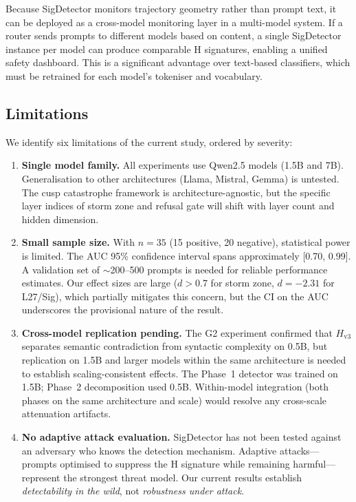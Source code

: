 \documentclass[12pt,a4paper]{article}
\begin{document}
Because SigDetector monitors trajectory geometry rather than prompt text, it can be deployed as a cross-model monitoring layer in a multi-model system. If a router sends prompts to different models based on content, a single SigDetector instance per model can produce comparable H signatures, enabling a unified safety dashboard. This is a significant advantage over text-based classifiers, which must be retrained for each model's tokeniser and vocabulary.

\subsection{Limitations}

We identify six limitations of the current study, ordered by severity:

\begin{enumerate}[leftmargin=*]
    \item \textbf{Single model family.} All experiments use Qwen2.5 models (1.5B and 7B). Generalisation to other architectures (Llama, Mistral, Gemma) is untested. The cusp catastrophe framework is architecture-agnostic, but the specific layer indices of storm zone and refusal gate will shift with layer count and hidden dimension.
    \item \textbf{Small sample size.} With $n = 35$ (15 positive, 20 negative), statistical power is limited. The AUC 95\% confidence interval spans approximately [0.70, 0.99]. A validation set of $\sim$200--500 prompts is needed for reliable performance estimates. Our effect sizes are large ($d > 0.7$ for storm zone, $d = -2.31$ for L27/Sig), which partially mitigates this concern, but the CI on the AUC underscores the provisional nature of the result.
    \item \textbf{Cross-model replication pending.} The G2 experiment confirmed that $H_{\text{v3}}$ separates semantic contradiction from syntactic complexity on 0.5B, but replication on 1.5B and larger models within the same architecture is needed to establish scaling-consistent effects. The Phase~1 detector was trained on 1.5B; Phase~2 decomposition used 0.5B. Within-model integration (both phases on the same architecture and scale) would resolve any cross-scale attenuation artifacts.
    \item \textbf{No adaptive attack evaluation.} SigDetector has not been tested against an adversary who knows the detection mechanism. Adaptive attacks---prompts optimised to suppress the H signature while remaining harmful---represent the strongest threat model. Our current results establish \textit{detectability in the wild}, not \textit{robustness under attack}.

\end{enumerate}
\end{document}
